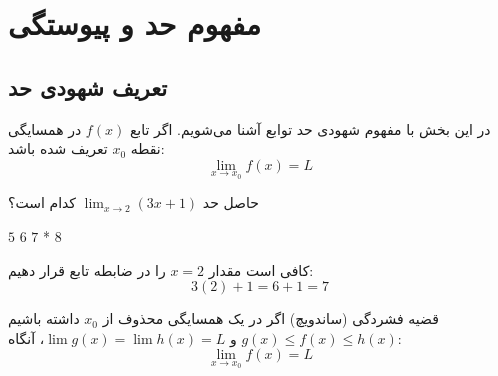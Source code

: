 \chapter{مفهوم حد و پیوستگی}

\section{تعریف شهودی حد}
در این بخش با مفهوم شهودی حد توابع آشنا می‌شویم.
اگر تابع $f(x)$ در همسایگی نقطه $x_0$ تعریف شده باشد:
$$\lim_{x \to x_0} f(x) = L$$

\begin{question}
حاصل حد $\lim_{x \to 2} (3x + 1)$ کدام است؟
\begin{choices}
\choice $5$
\choice $6$
\choice $7$ *
\choice $8$
\end{choices}
\begin{explanation}
کافی است مقدار $x = 2$ را در ضابطه تابع قرار دهیم:
$$3(2) + 1 = 6 + 1 = 7$$
\end{explanation}
\end{question}

\begin{flashcard}{قضیه فشردگی (ساندویچ)}
اگر در یک همسایگی محذوف از $x_0$ داشته باشیم $g(x) \le f(x) \le h(x)$ و $\lim g(x) = \lim h(x) = L$، آنگاه:
$$\lim_{x \to x_0} f(x) = L$$
\end{flashcard}
